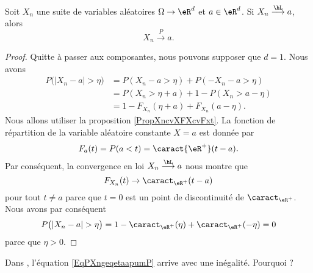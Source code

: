 \begin{proposition}     \label{PropCvLfcvPsicst}
    Soit \( X_n\) une suite de variables aléatoires \( \Omega\to \eR^d\) et \( a\in\eR^d\). Si \( X_n\stackrel{\hL}{\longrightarrow}a\), alors
    \begin{equation}
        X_n\stackrel{P}{\longrightarrow}a.
    \end{equation}
\end{proposition}

\begin{proof}
    Quitte à passer aux composantes, nous pouvons supposer que \( d=1\). Nous avons
    \begin{subequations}
        \begin{align}
           P\big( | X_n-a |>\eta \big)&=P(X_n-a>\eta)+P(-X_n-a>\eta)\\
           &=P(X_n>\eta+a)+1-P(X_n>a-\eta)  \label{EqPXngeqetaapumP}\\
           &=1-F_{X_n}(\eta+a)+F_{X_n}(a-\eta).
        \end{align}
    \end{subequations}
    Nous allons utiliser la proposition \ref{PropXncvXFXcvFxt}. La fonction de répartition de la variable aléatoire constante \( X=a\) est donnée par
    \begin{equation}
        F_a(t)=P(a<t)=\caract{\eR^+}(t-a).
    \end{equation}
    Par conséquent, la convergence en loi \( X_n\stackrel{\hL}{\longrightarrow}a\) nous montre que
    \begin{equation}
        F_{X_n}(t)\to \caract_{\eR^+}(t-a)
    \end{equation}
    pour tout \( t\neq a\) parce que \( t=0\) est un point de discontinuité de \( \caract_{\eR^+}\). Nous avons par conséquent
    \begin{equation}
        P\big( | X_n-a |>\eta \big)=1-\caract_{\eR^+}(\eta)+\caract_{\eR^+}(-\eta)=0
    \end{equation}
    parce que \( \eta>0\).
\end{proof}

\begin{probleme}
    Dans \cite{CourgGudRennes}, l'équation \eqref{EqPXngeqetaapumP} arrive avec une inégalité. Pourquoi ?
\end{probleme}

